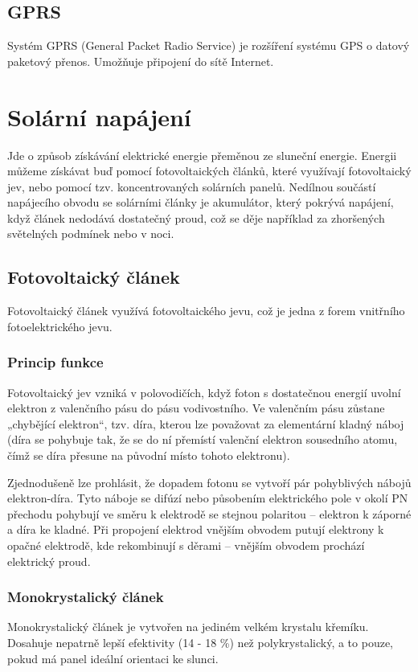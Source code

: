 \subsection*{GPRS}
Systém GPRS (General Packet Radio Service) je rozšíření systému GPS o datový paketový přenos. Umožňuje připojení do sítě Internet.

\section{Solární napájení}
Jde o způsob získávání elektrické energie přeměnou ze sluneční energie. Energii můžeme získávat buď pomocí fotovoltaických článků, které využívají fotovoltaický jev, nebo pomocí tzv. koncentrovaných solárních panelů. Nedílnou součástí napájecího obvodu se solárními články je akumulátor, který pokrývá napájení, když článek nedodává dostatečný proud, což se děje například za zhoršených světelných podmínek nebo v noci.

\subsection*{Fotovoltaický článek}
Fotovoltaický článek využívá fotovoltaického jevu, což je jedna z forem vnitřního fotoelektrického jevu.

\subsubsection*{Princip funkce}
Fotovoltaický jev vzniká v polovodičích, když foton s dostatečnou energií uvolní elektron z valenčního pásu do pásu vodivostního. Ve valenčním pásu zůstane „chybějící elektron“, tzv. díra, kterou lze považovat za elementární kladný náboj (díra se pohybuje tak, že se do ní přemístí valenční elektron sousedního atomu, čímž se díra přesune na původní místo tohoto elektronu).

Zjednodušeně lze prohlásit, že dopadem fotonu se vytvoří pár pohyblivých nábojů elektron-díra. Tyto náboje se difúzí nebo působením elektrického pole v okolí PN přechodu pohybují ve směru k elektrodě se stejnou polaritou – elektron k záporné a díra ke kladné. Při propojení elektrod vnějším obvodem putují elektrony k opačné elektrodě, kde rekombinují s děrami – vnějším obvodem prochází elektrický proud.\cite{bechnik_2014}

\subsubsection*{Monokrystalický článek} 
Monokrystalický článek je vytvořen na jediném velkém krystalu křemíku.
Dosahuje nepatrně lepší efektivity (14 - 18 \%) než polykrystalický, a to pouze, pokud
má panel ideální orientaci ke slunci.

